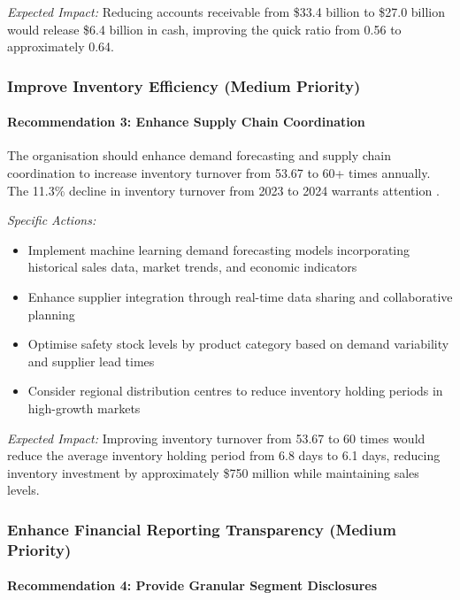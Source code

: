 \documentclass[12pt,a4paper]{article}
\begin{document}
\textit{Expected Impact:} Reducing accounts receivable from \$33.4 billion to \$27.0 billion would release \$6.4 billion in cash, improving the quick ratio from 0.56 to approximately 0.64.

\subsubsection{Improve Inventory Efficiency (Medium Priority)}

\paragraph{Recommendation 3: Enhance Supply Chain Coordination}

The organisation should enhance demand forecasting and supply chain coordination to increase inventory turnover from 53.67 to 60+ times annually. The 11.3\% decline in inventory turnover from 2023 to 2024 warrants attention \citep{apple202410k}.

\textit{Specific Actions:}
\begin{itemize}
\item Implement machine learning demand forecasting models incorporating historical sales data, market trends, and economic indicators
\item Enhance supplier integration through real-time data sharing and collaborative planning
\item Optimise safety stock levels by product category based on demand variability and supplier lead times
\item Consider regional distribution centres to reduce inventory holding periods in high-growth markets
\end{itemize}

\textit{Expected Impact:} Improving inventory turnover from 53.67 to 60 times would reduce the average inventory holding period from 6.8 days to 6.1 days, reducing inventory investment by approximately \$750 million while maintaining sales levels.

\subsubsection{Enhance Financial Reporting Transparency (Medium Priority)}

\paragraph{Recommendation 4: Provide Granular Segment Disclosures}
\end{document}
